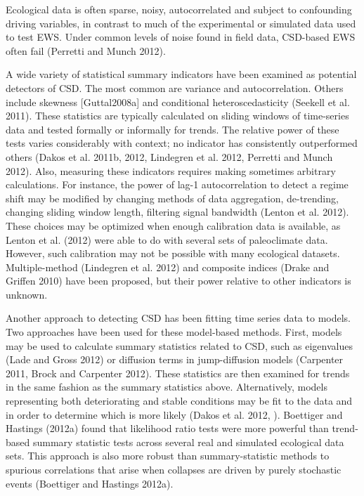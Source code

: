 \documentclass{article}
\begin{document}
Ecological data is often sparse, noisy, autocorrelated and subject to
confounding driving variables, in contrast to much of the experimental
or simulated data used to test EWS. Under common levels of noise found
in field data, CSD-based EWS often fail (Perretti and Munch 2012).

A wide variety of statistical summary indicators have been examined as
potential detectors of CSD. The most common are variance and
autocorrelation. Others include skewness {[}Guttal2008a{]} and
conditional heteroscedasticity (Seekell et al. 2011). These statistics
are typically calculated on sliding windows of time-series data and
tested formally or informally for trends. The relative power of these
tests varies considerably with context; no indicator has consistently
outperformed others (Dakos et al. 2011b, 2012, Lindegren et al. 2012,
Perretti and Munch 2012). Also, measuring these indicators requires
making sometimes arbitrary calculations. For instance, the power of
lag-1 autocorrelation to detect a regime shift may be modified by
changing methods of data aggregation, de-trending, changing sliding
window length, filtering signal bandwidth (Lenton et al. 2012). These
choices may be optimized when enough calibration data is available, as
Lenton et al. (2012) were able to do with several sets of paleoclimate
data. However, such calibration may not be possible with many ecological
datasets. Multiple-method (Lindegren et al. 2012) and composite indices
(Drake and Griffen 2010) have been proposed, but their power relative to
other indicators is unknown.

Another approach to detecting CSD has been fitting time series data to
models. Two approaches have been used for these model-based methods.
First, models may be used to calculate summary statistics related to
CSD, such as eigenvalues (Lade and Gross 2012) or diffusion terms in
jump-diffusion models (Carpenter 2011, Brock and Carpenter 2012). These
statistics are then examined for trends in the same fashion as the
summary statistics above. Alternatively, models representing both
deteriorating and stable conditions may be fit to the data and in order
to determine which is more likely (Dakos et al. 2012, ). Boettiger and
Hastings (2012a) found that likelihood ratio tests were more powerful
than trend-based summary statistic tests across several real and
simulated ecological data sets. This approach is also more robust than
summary-statistic methods to spurious correlations that arise when
collapses are driven by purely stochastic events (Boettiger and Hastings
2012a).
\end{document}
